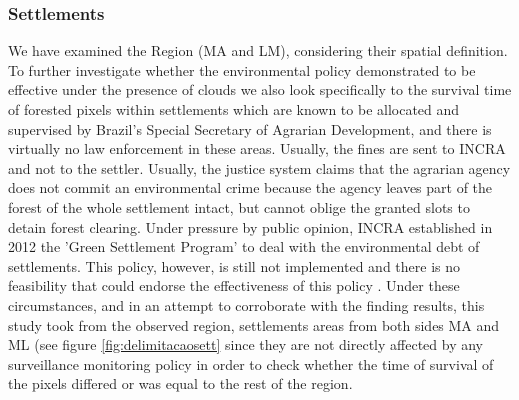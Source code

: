 \subsubsection{Settlements} \label{resultssection3.1}

We have examined the Region (MA and LM), considering their spatial definition. To further investigate whether the environmental policy demonstrated to be effective under the presence of clouds we also look specifically to the survival time of forested pixels within settlements which are known to be allocated and supervised by Brazil’s Special Secretary of Agrarian Development, and there is virtually no law enforcement in these areas. Usually, the fines are sent to INCRA and not to the settler. Usually, the justice system claims that the agrarian agency does not commit an environmental crime because the agency leaves part of the forest of the whole settlement intact, but cannot oblige the granted slots to detain forest clearing. Under pressure by public opinion, INCRA established in 2012 the 'Green Settlement Program' to deal with the environmental debt of settlements. This policy, however, is still not implemented and there is no feasibility that could endorse the effectiveness of this policy \citet{PACHECO,PERES2}. Under these circumstances, and in an attempt to corroborate with the finding results, this study took from the observed region, settlements areas from both sides MA and ML (see figure \ref{fig:delimitacaosett} since they are not directly affected by any surveillance monitoring policy in order to check whether the time of survival of the pixels differed or was equal to the rest of the region.

